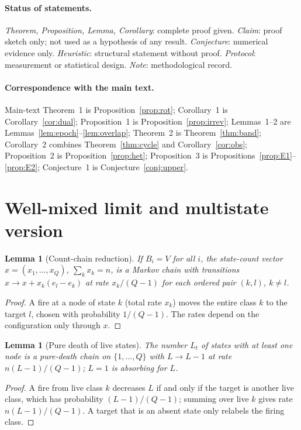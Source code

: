 \documentclass[aps,pre,onecolumn,superscriptaddress,amsmath,amssymb,longbibliography]{revtex4-2}
\newtheorem{lemma}[theorem]{Lemma}
\theoremstyle{definition}
\theoremstyle{remark}
\begin{document}
\paragraph*{Status of statements.} \emph{Theorem, Proposition, Lemma,
Corollary}: complete proof given. \emph{Claim}: proof sketch only; not
used as a hypothesis of any result. \emph{Conjecture}: numerical evidence
only. \emph{Heuristic}: structural statement without proof.
\emph{Protocol}: measurement or statistical design. \emph{Note}:
methodological record.

\paragraph*{Correspondence with the main text.} Main-text
Theorem~1 is Proposition~\ref{prop:rot}; Corollary~1 is
Corollary~\ref{cor:dual}; Proposition~1 is Proposition~\ref{prop:irrev};
Lemmas~1--2 are Lemmas~\ref{lem:epoch}--\ref{lem:overlap}; Theorem~2 is
Theorem~\ref{thm:band}; Corollary~2 combines Theorem~\ref{thm:cycle} and
Corollary~\ref{cor:obs}; Proposition~2 is Proposition~\ref{prop:het};
Proposition~3 is Propositions~\ref{prop:E1}--\ref{prop:E2};
Conjecture~1 is Conjecture~\ref{conj:upper}.

\section{Well-mixed limit and multistate version}
\label{sec:S2}

\begin{lemma}[Count-chain reduction]
\label{lem:A1}
If $B_i=V$ for all $i$, the state-count vector $x=(x_1,\dots,x_Q)$,
$\sum_kx_k=n$, is a Markov chain with transitions
$x\to x+x_k(e_l-e_k)$ at rate $x_k/(Q-1)$ for each ordered pair $(k,l)$,
$k\ne l$.
\end{lemma}
\begin{proof}
A fire at a node of state $k$ (total rate $x_k$) moves the entire class
$k$ to the target $l$, chosen with probability $1/(Q-1)$. The rates
depend on the configuration only through $x$.
\end{proof}

\begin{lemma}[Pure death of live states]
\label{lem:A2}
The number $L_t$ of states with at least one node is a pure-death chain
on $\{1,\dots,Q\}$ with $L\to L-1$ at rate $n(L-1)/(Q-1)$; $L=1$ is
absorbing for $L$.
\end{lemma}
\begin{proof}
A fire from live class $k$ decreases $L$ if and only if the target is
another live class, which has probability $(L-1)/(Q-1)$; summing over
live $k$ gives rate $n(L-1)/(Q-1)$. A target that is an absent state only
relabels the firing class.
\end{proof}
\end{document}
